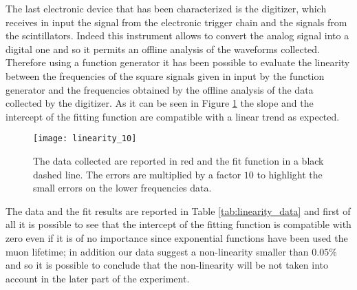 
The last electronic device that has been characterized is the digitizer, which receives in input the signal from the electronic trigger chain and the signals from the scintillators. Indeed this instrument allows to convert the analog signal into a digital one and so it permits an offline analysis of the waveforms collected. Therefore using a function generator it has been possible to evaluate the linearity between the frequencies of the square signals given in input by the function generator and the frequencies obtained by the offline analysis of the data collected by the digitizer. As it can be seen in Figure \ref{fig:digitizer_linearity} the slope and the intercept of the fitting function are compatible with a linear trend as expected.
\begin{figure}[!htp]
	\centering
	\texttt{[image: linearity\_10]}
	\caption{The data collected are reported in red and the fit function in a black dashed line. The errors are multiplied by a factor $10$ to highlight the small errors on the lower frequencies data.}
	\label{fig:digitizer_linearity}
\end{figure}
The data and the fit results are reported in Table \ref{tab:linearity_data} and first of all it is possible to see that the intercept of the fitting function is compatible with zero even if it is of no importance since exponential functions have been used the muon lifetime; in addition our data suggest a non-linearity smaller than $0.05\%$ and so it is possible to conclude that the non-linearity will be not taken into account in the later part of the experiment.
